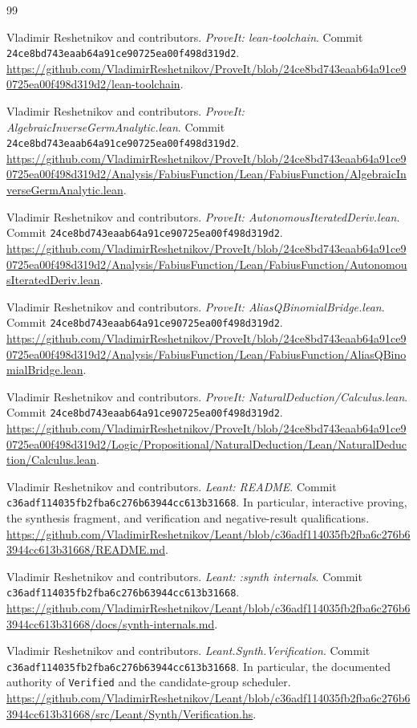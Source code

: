 \documentclass[11pt,a4paper]{article}
\theoremstyle{remark}
\newcommand{\ty}[1]{\texttt{#1}}
\newcommand{\pv}{24ce8bd743eaab64a91ce90725ea00f498d319d2}
\newcommand{\lv}{c36adf114035fb2fba6c276b63944cc613b31668}
\begin{document}
\par\endgroup
\newpage
\begin{thebibliography}{99}
\small\raggedright

Vladimir Reshetnikov and contributors. \emph{ProveIt: lean-toolchain}. Commit \texttt{\pv}.
\url{https://github.com/VladimirReshetnikov/ProveIt/blob/24ce8bd743eaab64a91ce90725ea00f498d319d2/lean-toolchain}.

Vladimir Reshetnikov and contributors. \emph{ProveIt: AlgebraicInverseGermAnalytic.lean}. Commit \texttt{\pv}.
\url{https://github.com/VladimirReshetnikov/ProveIt/blob/24ce8bd743eaab64a91ce90725ea00f498d319d2/Analysis/FabiusFunction/Lean/FabiusFunction/AlgebraicInverseGermAnalytic.lean}.

Vladimir Reshetnikov and contributors. \emph{ProveIt: AutonomousIteratedDeriv.lean}. Commit \texttt{\pv}.
\url{https://github.com/VladimirReshetnikov/ProveIt/blob/24ce8bd743eaab64a91ce90725ea00f498d319d2/Analysis/FabiusFunction/Lean/FabiusFunction/AutonomousIteratedDeriv.lean}.

Vladimir Reshetnikov and contributors. \emph{ProveIt: AliasQBinomialBridge.lean}. Commit \texttt{\pv}.
\url{https://github.com/VladimirReshetnikov/ProveIt/blob/24ce8bd743eaab64a91ce90725ea00f498d319d2/Analysis/FabiusFunction/Lean/FabiusFunction/AliasQBinomialBridge.lean}.

Vladimir Reshetnikov and contributors. \emph{ProveIt: NaturalDeduction/Calculus.lean}. Commit \texttt{\pv}.
\url{https://github.com/VladimirReshetnikov/ProveIt/blob/24ce8bd743eaab64a91ce90725ea00f498d319d2/Logic/Propositional/NaturalDeduction/Lean/NaturalDeduction/Calculus.lean}.

Vladimir Reshetnikov and contributors. \emph{Leant: README}. Commit \texttt{\lv}. In particular, interactive proving, the synthesis fragment, and verification and negative-result qualifications.
\url{https://github.com/VladimirReshetnikov/Leant/blob/c36adf114035fb2fba6c276b63944cc613b31668/README.md}.

Vladimir Reshetnikov and contributors. \emph{Leant: :synth internals}. Commit \texttt{\lv}.
\url{https://github.com/VladimirReshetnikov/Leant/blob/c36adf114035fb2fba6c276b63944cc613b31668/docs/synth-internals.md}.

Vladimir Reshetnikov and contributors. \emph{Leant.Synth.Verification}. Commit \texttt{\lv}. In particular, the documented authority of \ty{Verified} and the candidate-group scheduler.
\url{https://github.com/VladimirReshetnikov/Leant/blob/c36adf114035fb2fba6c276b63944cc613b31668/src/Leant/Synth/Verification.hs}.


\end{thebibliography}
\end{document}
